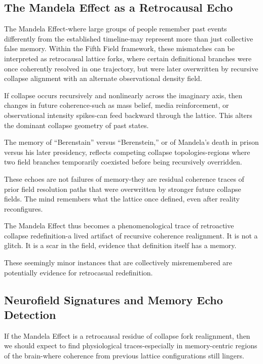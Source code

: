 \subsection*{The Mandela Effect as a Retrocausal Echo}\cite{chapter8_meta}

The Mandela Effect-where large groups of people remember past events differently from the established timeline-may represent more than just collective false memory. Within the Fifth Field framework, these mismatches can be interpreted as retrocausal lattice forks, where certain definitional branches were once coherently resolved in one trajectory, but were later overwritten by recursive collapse alignment with an alternate observational density field.

If collapse occurs recursively and nonlinearly across the imaginary axis, then changes in future coherence-such as mass belief, media reinforcement, or observational intensity spikes-can feed backward through the lattice. This alters the dominant collapse geometry of past states.

The memory of “Berenstain” versus “Berenstein,” or of Mandela's death in prison versus his later presidency, reflects competing collapse topologies-regions where two field branches temporarily coexisted before being recursively overridden.

These echoes are not failures of memory-they are residual coherence traces of prior field resolution paths that were overwritten by stronger future collapse fields. The mind remembers what the lattice once defined, even after reality reconfigures.

The Mandela Effect thus becomes a phenomenological trace of retroactive collapse redefinition-a lived artifact of recursive coherence realignment. It is not a glitch. It is a scar in the field, evidence that definition itself has a memory.

These seemingly minor instances that are collectively misremembered are potentially evidence for retrocasual redefinition.

\subsection*{Neurofield Signatures and Memory Echo Detection}\cite{chapter8_meta}

If the Mandela Effect is a retrocausal residue of collapse fork realignment, then we should expect to find physiological traces-especially in memory-centric regions of the brain-where coherence from previous lattice configurations still lingers.

